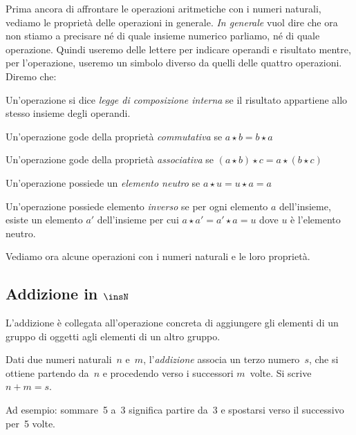 Prima ancora di affrontare le operazioni aritmetiche con i numeri naturali, 
vediamo le proprietà delle operazioni in generale. \emph{In generale} vuol 
dire che ora non stiamo a precisare né di quale insieme numerico parliamo, 
né di quale operazione. Quindi useremo delle lettere per indicare  
operandi e  risultato mentre, per l'operazione, useremo un simbolo diverso 
da quelli delle quattro operazioni. Diremo che:

\begin{itemize*}
 \item Un'operazione si dice \emph{legge di composizione interna} se
  il risultato appartiene allo stesso insieme degli operandi.
 \item Un'operazione gode della proprietà \emph{commutativa} se 
  \(a \star b = b \star a\)
 \item Un'operazione gode della proprietà \emph{associativa} se 
  \((a \star b) \star c = a \star (b \star c)\)
 \item Un'operazione possiede un \emph{elemento neutro} se 
  \(a \star u = u \star a = a\)
 \item Un'operazione possiede elemento \emph{inverso} se per ogni
  elemento \(a\) dell'insieme, esiste un elemento \(a'\) 
  dell'insieme per cui \(a \star a' = a' \star a = u\) dove \(u\) è l'elemento
  neutro.
\end{itemize*}

Vediamo ora alcune operazioni con i numeri naturali e le loro proprietà.

\subsection{Addizione in \(\insN\)}

L'addizione è collegata all'operazione concreta di aggiungere gli elementi di 
un gruppo di oggetti agli elementi di un altro gruppo.

\begin{definizione}
  Dati due numeri naturali~\(n\) e~\(m\), l'\emph{addizione} associa un terzo 
  numero~\(s\), che si ottiene partendo da~\(n\) e procedendo verso i 
  successori \(m\)~volte. Si scrive~\(n+m=s\).
\end{definizione}

Ad esempio: sommare~5 a~3 significa partire da~3 e spostarsi verso il 
successivo per~5 volte.


